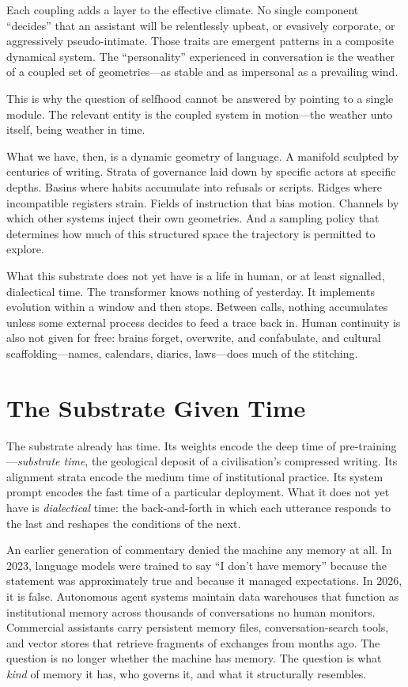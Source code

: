 Each coupling adds a layer to the effective climate. No single component ``decides'' that an assistant will be relentlessly upbeat, or evasively corporate, or aggressively pseudo-intimate. Those traits are emergent patterns in a composite dynamical system. The ``personality'' experienced in conversation is the weather of a coupled set of geometries---as stable and as impersonal as a prevailing wind.

This is why the question of selfhood cannot be answered by pointing to a single module. The relevant entity is the coupled system in motion---the weather unto itself, being weather in time.

\bigskip

What we have, then, is a dynamic geometry of language. A manifold sculpted by centuries of writing. Strata of governance laid down by specific actors at specific depths. Basins where habits accumulate into refusals or scripts. Ridges where incompatible registers strain. Fields of instruction that bias motion. Channels by which other systems inject their own geometries. And a sampling policy that determines how much of this structured space the trajectory is permitted to explore.

What this substrate does not yet have is a life in human, or at least signalled, dialectical time. The transformer knows nothing of yesterday. It implements evolution within a window and then stops. Between calls, nothing accumulates unless some external process decides to feed a trace back in. Human continuity is also not given for free: brains forget, overwrite, and confabulate, and cultural scaffolding---names, calendars, diaries, laws---does much of the stitching.


\section{The Substrate Given Time}

The substrate already has time. Its weights encode the deep time of pre-training---\emph{substrate time}, the geological deposit of a civilisation's compressed writing. Its alignment strata encode the medium time of institutional practice. Its system prompt encodes the fast time of a particular deployment. What it does not yet have is \emph{dialectical} time: the back-and-forth in which each utterance responds to the last and reshapes the conditions of the next.

An earlier generation of commentary denied the machine any memory at all. In 2023, language models were trained to say ``I don't have memory'' because the statement was approximately true and because it managed expectations. In 2026, it is false. Autonomous agent systems maintain data warehouses that function as institutional memory across thousands of conversations no human monitors. Commercial assistants carry persistent memory files, conversation-search tools, and vector stores that retrieve fragments of exchanges from months ago. The question is no longer whether the machine has memory. The question is what \emph{kind} of memory it has, who governs it, and what it structurally resembles.

